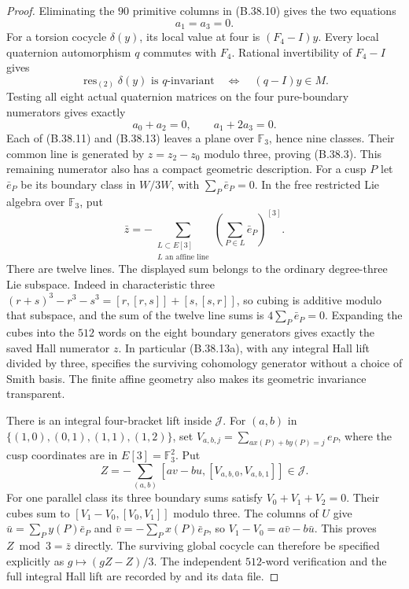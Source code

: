 \begin{proof}
Eliminating the $90$ primitive columns in (B.38.10)
gives the two equations
\[
                        a_1=a_3=0.                           \tag{B.38.11}
\]
For a torsion cocycle $\delta(y)$, its local value
at four is $(F_4-I)y$.
Every local quaternion automorphism $q$ commutes
with $F_4$. Rational invertibility of $F_4-I$ gives
\[
 \operatorname{res}_{(2)}\delta(y)\text{ is }q\text{-invariant}
        \quad\Longleftrightarrow\quad(q-I)y\in M.             \tag{B.38.12}
\]
Testing all eight actual quaternion matrices on the
four pure-boundary numerators gives exactly
\[
                    a_0+a_2=0,\qquad a_1+2a_3=0.             \tag{B.38.13}
\]
Each of (B.38.11) and (B.38.13) leaves a plane over
$\mathbb F_3$, hence nine classes.
Their common line is generated by $z=z_2-z_0$ modulo
three, proving (B.38.3).
This remaining numerator also has a compact geometric
description. For a cusp $P$ let $\bar e_P$ be its
boundary class in $W/3W$, with $\sum_P\bar e_P=0$.
In the free restricted Lie algebra over $\mathbb F_3$,
put
\[
 \bar z=-\sum_{\substack{L\subset E[3]\\L\text{ an affine line}}}
                \left(\sum_{P\in L}\bar e_P\right)^{[3]}.
                                                              \tag{B.38.13a}
\]
There are twelve lines. The displayed sum belongs to
the ordinary degree-three Lie subspace. Indeed in
characteristic three
$(r+s)^3-r^3-s^3=[r,[r,s]]+[s,[s,r]]$,
so cubing is additive modulo that subspace, and the
sum of the twelve line sums is $4\sum_P\bar e_P=0$.
Expanding the cubes into the $512$ words on the eight
boundary generators gives exactly the saved Hall
numerator $z$. In particular (B.38.13a), with any
integral Hall lift divided by three, specifies the
surviving cohomology generator without a choice of
Smith basis. The finite affine geometry also makes
its geometric invariance transparent.

There is an integral four-bracket lift inside
$\mathcal J$. For $(a,b)$ in
$\{(1,0),(0,1),(1,1),(1,2)\}$, set
$V_{a,b,j}=\sum_{ax(P)+by(P)=j}e_P$, where the cusp
coordinates are in $E[3]=\mathbb F_3^2$.
Put
\[
 Z=-\sum_{(a,b)}
             [a v-b u,[V_{a,b,0},V_{a,b,1}]]\in\mathcal J.
                                                              \tag{B.38.13b}
\]
For one parallel class its three boundary sums satisfy
$V_0+V_1+V_2=0$. Their cubes sum to
$[V_1-V_0,[V_0,V_1]]$ modulo three.
The columns of $U$ give
$\bar u=\sum_P y(P)\bar e_P$ and
$\bar v=-\sum_P x(P)\bar e_P$, so
$V_1-V_0=a\bar v-b\bar u$.
This proves $Z\bmod3=\bar z$ directly.
The surviving global cocycle can therefore be specified
explicitly as $g\mapsto(gZ-Z)/3$.
The independent $512$-word verification and the full
integral Hall lift are recorded by
 and its data file.


\end{proof}
